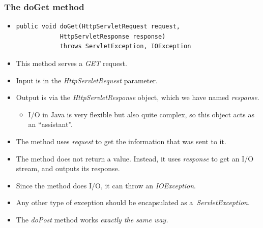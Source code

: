 \documentclass[10pt,xcolor=pdflatex]{beamer}
\begin{document}
\begin{frame}[containsverbatim]\frametitle{The doGet method}
\begin{itemize}
    \item[] \begin{em}\begin{verbatim}
public void doGet(HttpServletRequest request,
            HttpServletResponse response)
            throws ServletException, IOException
\end{verbatim} \end{em}
    \item This method serves a \emph{GET} request.
    \item Input is in the \emph{HttpServletRequest} parameter.
    \item Output is via the \emph{HttpServletResponse} object, which we have named \emph{response}.
        \begin{itemize}
        	\item I/O in Java is very flexible but also quite complex, so this object acts as an “assistant”.
        \end{itemize}
	\item The method uses \emph{request} to get the information that was sent to it.
	\item The method does not return a value. Instead, it uses \emph{response} to get an I/O stream, and outputs its response.
	\item Since the method does I/O, it can throw an \emph{IOException}.
	\item Any other type of exception should be encapsulated as a~\emph{ServletException}.
	\item The \emph{doPost} method works \it{exactly} the same way.
\end{itemize}
\end{frame}
\end{document}
